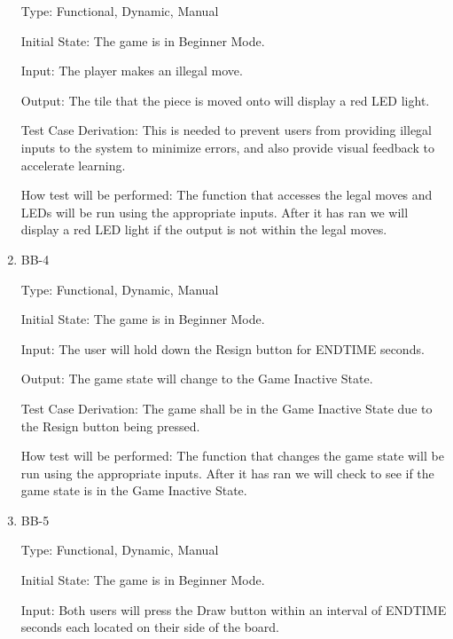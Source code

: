 \documentclass[12pt, titlepage]{article}
\begin{document}
\begin{enumerate}
      Type: Functional, Dynamic, Manual
                          
      Initial State: The game is in Beginner Mode.
                          
      Input: The player makes an illegal move.
                          
      Output: The tile that the piece is moved onto will display a red LED
      light.
                          
      Test Case Derivation: This is needed to prevent users from providing illegal inputs to the system
      to minimize errors, and also provide visual feedback to accelerate learning.
  
      How test will be performed: The function that accesses the legal moves and LEDs will be run using the appropriate inputs.
      After it has ran we will display a red LED light if the output is not within the legal moves.  
  
      \item{BB-4\\}
  
      Type: Functional, Dynamic, Manual
                        
      Initial State: The game is in Beginner Mode.
                          
      Input: The user will hold down the Resign button for ENDTIME seconds.
                          
      Output: The game state will change to the Game Inactive State.
                          
      Test Case Derivation: The game shall be in the Game Inactive State due to the Resign button being pressed.
      
      How test will be performed: The function that changes the game state will be run using the appropriate inputs.
      After it has ran we will check to see if the game state is in the Game Inactive State.
  
      \item{BB-5\\}
  
      Type: Functional, Dynamic, Manual
                        
      Initial State: The game is in Beginner Mode.
                          
      Input: Both users will press the Draw button within an interval of ENDTIME seconds each located on their side of the board.
                          

\end{enumerate}
\end{document}
